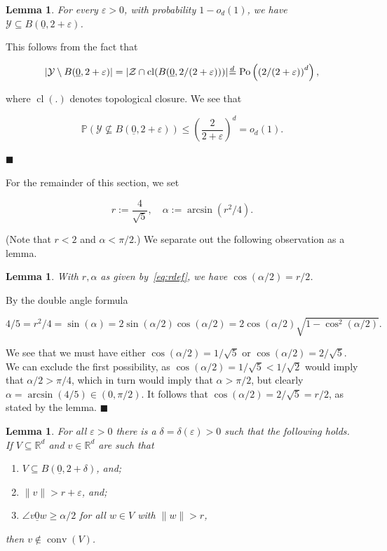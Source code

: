 \documentclass[11pt]{article}%
\newenvironment{proof}{\vspace{1ex}\noindent{\bf Proof.}}{\hspace*{\fill}$\blacksquare$\vspace{1ex}}
\newtheorem{lemma} [theorem] {Lemma}%
\newcommand{\Ycal}[0]{\ensuremath{{\mathcal Y}}}
\newcommand{\Zcal}[0]{\ensuremath{{\mathcal Z}}}
\newcommand{\eR}[0]{\ensuremath{ \mathbb R}}
\newcommand{\norm}[1]{\ensuremath{\|#1\|}}
\newcommand{\Pee}[0]{\ensuremath{{\mathbb P}}}
\newcommand{\isd}[0]{\hspace{.2ex} \raisebox{-.1ex}{$=$} \hspace{-1.5ex} 
\raisebox{1ex}{{$\scriptstyle d$}} \hspace{.8ex} }
\newcommand{\eps}{\varepsilon}
\newcommand{\orig}{\underline{0}}
\DeclareMathOperator{\conv}{conv}
\DeclareMathOperator{\clo}{cl}
\DeclareMathOperator{\Po}{Po}
\begin{document}
\begin{lemma}\label{lem:Yball2}
 For every $\eps>0$, with probability $1-o_d(1)$, we have $\Ycal \subseteq B(\orig,2+\eps)$.
\end{lemma}

\begin{proof}
This follows from the fact that

$$ |\Ycal \setminus B(\orig,2+\eps)| = |\Zcal \cap \clo(B(\orig,2/(2+\eps))) | \isd 
\Po\left( \left(2/(2+\eps)\right)^d \right), $$ 

\noindent
where $\clo(.)$ denotes topological closure. We see that 

$$ \Pee( \Ycal \not\subseteq B(\orig,2+\eps) ) \leq \left(\frac{2}{2+\eps}\right)^d = o_d(1). $$

\end{proof}


For the remainder of this section, we set 

\begin{equation}\label{eq:rdef}
 r := \frac{4}{\sqrt{5}}, \quad \alpha := \arcsin(r^2/4).
\end{equation}

\noindent
(Note that $r<2$ and $\alpha < \pi/2$.)
We separate out the following observation as a lemma.

\begin{lemma}\label{lem:cosalpha2}
With $r,\alpha$ as given by~\eqref{eq:rdef}, we have $\cos(\alpha/2) = r/2$.
\end{lemma}

\begin{proof}
By the double angle formula

$$ 4/5 = r^2/4 = \sin(\alpha) = 2\sin(\alpha/2)\cos(\alpha/2) 
= 2 \cos(\alpha/2) \sqrt{1-\cos^2(\alpha/2)}. $$

\noindent
We see that we must have either $\cos(\alpha/2) = 1/\sqrt{5}$ or $\cos(\alpha/2) = 2/\sqrt{5}$.
We can exclude the first possibility, as $\cos(\alpha/2) = 1/\sqrt{5} < 1/\sqrt{2}$ would imply that 
$\alpha/2 > \pi/4$, which in turn would imply that $\alpha > \pi/2$, 
but clearly $\alpha = \arcsin(4/5) \in (0,\pi/2)$.
It follows that $\cos(\alpha/2) = 2/\sqrt{5} = r/2$, as stated by the lemma.
\end{proof}



\begin{lemma}\label{lem:notinconv}
For all $\eps > 0$ there is a $\delta=\delta(\eps)>0$ such that the following holds.
If $V \subseteq \eR^d$ and $v \in \eR^d$ are such that 
\begin{enumerate}
 \item $V \subseteq B(\orig,2+\delta)$, and;
 \item $\norm{v} > r+\eps$, and;
 \item $\angle v{\orig}w \geq \alpha/2$ for all $w \in V$ with $\norm{w} > r$, 
\end{enumerate}
then $v \not\in \conv(V)$.
\end{lemma}
\end{document}
